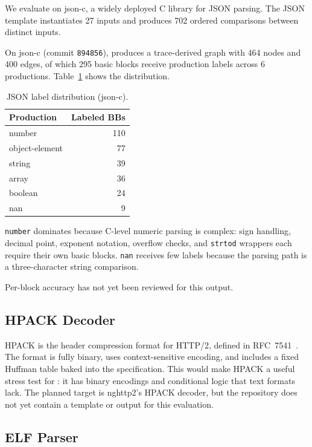 We evaluate on json-c, a widely deployed C library for JSON parsing.
The JSON template instantiates 27 inputs and produces 702 ordered comparisons between distinct inputs.

On json-c (commit \texttt{894856}), \toolname produces a trace-derived graph with 464 nodes and 400 edges, of which 295 basic blocks receive production labels across 6 productions.
Table~\ref{tab:json-labels} shows the distribution.

\begin{table}[h]
\caption{JSON label distribution (json-c).}
\label{tab:json-labels}
\centering
\begin{tabular}{lr}
\toprule
Production & Labeled BBs \\
\midrule
number         & 110 \\
object-element & 77  \\
string         & 39  \\
array          & 36  \\
boolean        & 24  \\
nan            & 9   \\
\bottomrule
\end{tabular}
\end{table}

\texttt{number} dominates because C-level numeric parsing is complex: sign handling, decimal point, exponent notation, overflow checks, and \texttt{strtod} wrappers each require their own basic blocks.
\texttt{nan} receives few labels because the parsing path is a three-character string comparison.

Per-block accuracy has not yet been reviewed for this output.

\subsection{HPACK Decoder}\label{sec:eval:hpack}

HPACK is the header compression format for HTTP/2, defined in RFC~7541~\cite{rfc7541}.
The format is fully binary, uses context-sensitive encoding, and includes a fixed Huffman table baked into the specification.
This would make HPACK a useful stress test for \toolname: it has binary encodings and conditional logic that text formats lack.
The planned target is nghttp2's HPACK decoder, but the repository does not yet contain a template or output for this evaluation.

\subsection{ELF Parser}\label{sec:eval:elf}

